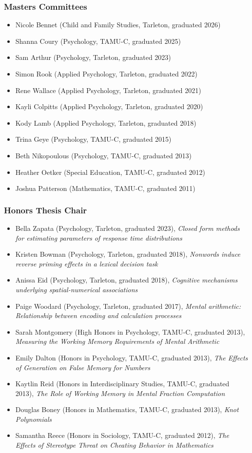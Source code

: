 \documentclass[article,10pt]{article}
\begin{document}
\subsubsection*{Masters Committees}
\label{sec:orgf33f9a1}
\begin{itemize}
\item Nicole Bennet (Child and Family Studies, Tarleton, graduated 2026)
\item Shanna Coury (Psychology, TAMU-C, graduated 2025)
\item Sam Arthur (Psychology, Tarleton, graduated 2023)
\item Simon Rook (Applied Psychology, Tarleton, graduated 2022)
\item Rene Wallace (Applied Psychology, Tarleton, graduated 2021)
\item Kayli Colpitts (Applied Psychology, Tarleton, graduated 2020)
\item Kody Lamb (Applied Psychology, Tarleton, graduated 2018)
\item Trina Geye (Psychology, TAMU-C, graduated 2015)
\item Beth Nikopoulous (Psychology, TAMU-C, graduated 2013)
\item Heather Oetker (Special Education, TAMU-C, graduated 2012)
\item Joshua Patterson (Mathematics, TAMU-C, graduated 2011)
\end{itemize}
\subsubsection*{Honors Thesis Chair}
\label{sec:org42e9230}
\begin{itemize}
\item Bella Zapata (Psychology, Tarleton, graduated 2023), \emph{Closed form methods for estimating parameters of response time distributions}
\item Kristen Bowman (Psychology, Tarleton, graduated 2018), \emph{Nonwords induce reverse priming effects in a lexical decision task}
\item Anissa Eid (Psychology, Tarleton, graduated 2018), \emph{Cognitive mechanisms underlying spatial-numerical associations}
\item Paige Woodard (Psychology, Tarleton, graduated 2017), \emph{Mental arithmetic: Relationship between encoding and calculation processes}
\item Sarah Montgomery (High Honors in Psychology, TAMU-C, graduated 2013), \emph{Measuring the Working Memory Requirements of Mental Arithmetic}
\item Emily Dalton (Honors in Psychology, TAMU-C, graduated 2013), \emph{The Effects of Generation on False Memory for Numbers}
\item Kaytlin Reid (Honors in Interdisciplinary Studies, TAMU-C, graduated 2013), \emph{The Role of Working Memory in Mental Fraction Computation}
\item Douglas Boney (Honors in Mathematics, TAMU-C, graduated 2013), \emph{Knot Polynomials}
\item Samantha Reece (Honors in Sociology, TAMU-C, graduated 2012), \emph{The Effects of Stereotype Threat on Cheating Behavior in Mathematics}
\end{itemize}
\end{document}
